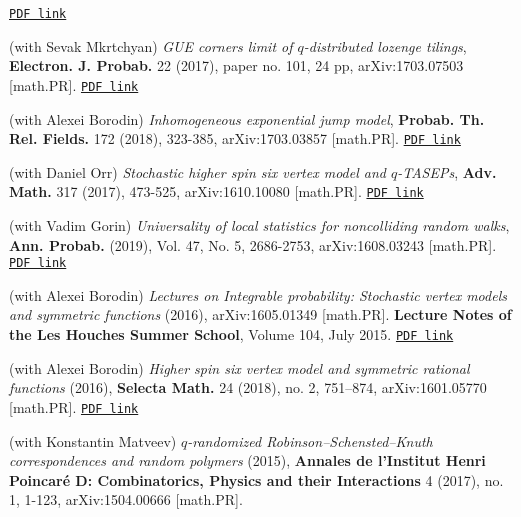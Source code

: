 \documentclass[letterpaper,11pt]{article}
\begin{document}
\begin{etaremune}
		\href{https://storage.lpetrov.cc/research_files/Petrov-publ/26-publ-petrov-uva.pdf}{\texttt{PDF link}}
	\item
	      (with Sevak Mkrtchyan)
	      \emph{GUE corners limit of $q$-distributed lozenge tilings},
				\textbf{Electron. J. Probab.} 22 (2017), paper no. 101, 24 pp,
				arXiv:1703.07503 [math.PR].
		\href{https://storage.lpetrov.cc/research_files/Petrov-publ/25-publ-petrov-uva.pdf}{\texttt{PDF link}}
	\item
	      (with Alexei Borodin)
		\emph{Inhomogeneous exponential jump model},
		\textbf{Probab. Th. Rel. Fields.} 
		172 (2018), 323-385,
		arXiv:1703.03857 [math.PR]. 
		\href{https://storage.lpetrov.cc/research_files/Petrov-publ/24-publ-petrov-uva-j.pdf}{\texttt{PDF link}}
	\item
	      (with Daniel Orr)
	      \emph{Stochastic higher spin six vertex model and $q$-TASEPs},
				\textbf{Adv. Math.} 317 (2017), 473-525, arXiv:1610.10080
	      [math.PR].
		\href{https://storage.lpetrov.cc/research_files/Petrov-publ/23-publ-petrov-uva.pdf}{\texttt{PDF link}}
			\item 
	      (with Vadim Gorin)
	      \emph{Universality of local statistics for noncolliding random
		      walks}, \textbf{Ann. Probab.} (2019), Vol. 47, No. 5, 2686-2753,
				arXiv:1608.03243 [math.PR]. 
		\href{https://storage.lpetrov.cc/research_files/Petrov-publ/22-publ-petrov-uva.pdf}{\texttt{PDF link}}
	\item
	      (with Alexei Borodin)
	      \emph{Lectures on Integrable probability: Stochastic vertex
		      models and symmetric functions}
	      (2016), arXiv:1605.01349 [math.PR]. \textbf{Lecture Notes of the Les
				Houches Summer School}, Volume 104, July 2015.
		\href{https://storage.lpetrov.cc/research_files/Petrov-publ/21-publ-petrov-uva.pdf}{\texttt{PDF link}}
	\item
	      (with Alexei Borodin)
	      \emph{Higher spin six vertex model and symmetric rational
		      functions}
	      (2016),
				\textbf{Selecta Math.} 24 (2018), no. 2, 751--874,
	      arXiv:1601.05770 [math.PR].
		\href{https://storage.lpetrov.cc/research_files/Petrov-publ/20-publ-petrov-uva.pdf}{\texttt{PDF link}}
	\item
	      (with Konstantin Matveev)
	      \emph{$q$-randomized Robinson--Schensted--Knuth correspondences
		      and random polymers}
	      (2015),
	      \textbf{Annales de l'Institut Henri Poincar\'e D: Combina\-torics, Phy\-sics
				and their Interactions} 4 (2017), no. 1, 1-123, arXiv:1504.00666 [math.PR].

\end{etaremune}
\end{document}
